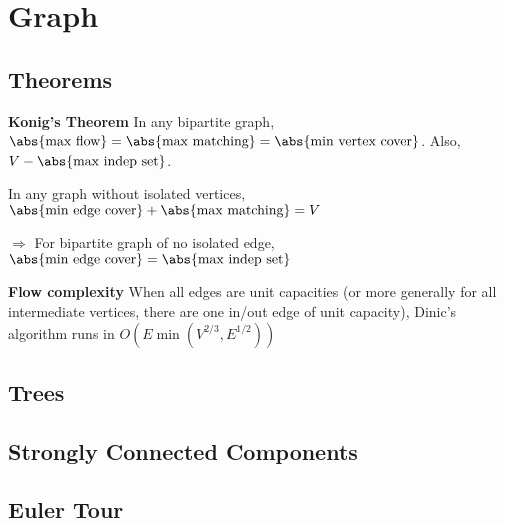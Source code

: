 \chapter{Graph}

\section{Theorems}

\textbf{Konig's Theorem} In any bipartite graph, $\abs{\text{max flow}} = \abs{\text{max matching}} = \abs{\text{min vertex cover}}$. Also, $V - \abs{\text{max indep set}}$. 

In any graph without isolated vertices, $\abs{\text{min edge cover}} + \abs{\text{max matching}} = V$

$\Rightarrow$ For bipartite graph of no isolated edge,  $\abs{\text{min edge cover}} = \abs{\text{max indep set}}$

\textbf{Flow complexity} When all edges are unit capacities (or more generally for all intermediate vertices, there are one in/out edge of unit capacity), Dinic's algorithm runs in $O(E \min(V^{2/3}, E^{1/2}))$
\section{Trees}

\section{Strongly Connected Components}

\section{Euler Tour}

